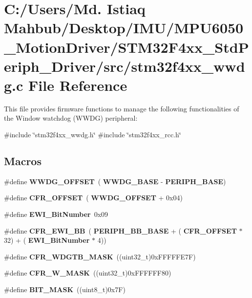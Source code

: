 \section{C\+:/\+Users/\+Md. Istiaq Mahbub/\+Desktop/\+I\+M\+U/\+M\+P\+U6050\+\_\+\+Motion\+Driver/\+S\+T\+M32\+F4xx\+\_\+\+Std\+Periph\+\_\+\+Driver/src/stm32f4xx\+\_\+wwdg.c File Reference}
\label{stm32f4xx__wwdg_8c}


This file provides firmware functions to manage the following functionalities of the Window watchdog (W\+W\+DG) peripheral\+:  


{\ttfamily \#include \char`\"{}stm32f4xx\+\_\+wwdg.\+h\char`\"{}}\newline
{\ttfamily \#include \char`\"{}stm32f4xx\+\_\+rcc.\+h\char`\"{}}\newline
\subsection*{Macros}
\begin{DoxyCompactItemize}
\item 
\#define \textbf{ W\+W\+D\+G\+\_\+\+O\+F\+F\+S\+ET}~(\textbf{ W\+W\+D\+G\+\_\+\+B\+A\+SE} -\/ \textbf{ P\+E\+R\+I\+P\+H\+\_\+\+B\+A\+SE})
\item 
\#define \textbf{ C\+F\+R\+\_\+\+O\+F\+F\+S\+ET}~(\textbf{ W\+W\+D\+G\+\_\+\+O\+F\+F\+S\+ET} + 0x04)
\item 
\#define \textbf{ E\+W\+I\+\_\+\+Bit\+Number}~0x09
\item 
\#define \textbf{ C\+F\+R\+\_\+\+E\+W\+I\+\_\+\+BB}~(\textbf{ P\+E\+R\+I\+P\+H\+\_\+\+B\+B\+\_\+\+B\+A\+SE} + (\textbf{ C\+F\+R\+\_\+\+O\+F\+F\+S\+ET} $\ast$ 32) + (\textbf{ E\+W\+I\+\_\+\+Bit\+Number} $\ast$ 4))
\item 
\#define \textbf{ C\+F\+R\+\_\+\+W\+D\+G\+T\+B\+\_\+\+M\+A\+SK}~((uint32\+\_\+t)0x\+F\+F\+F\+F\+F\+E7\+F)
\item 
\#define \textbf{ C\+F\+R\+\_\+\+W\+\_\+\+M\+A\+SK}~((uint32\+\_\+t)0x\+F\+F\+F\+F\+F\+F80)
\item 
\#define \textbf{ B\+I\+T\+\_\+\+M\+A\+SK}~((uint8\+\_\+t)0x7\+F)
\end{DoxyCompactItemize}
